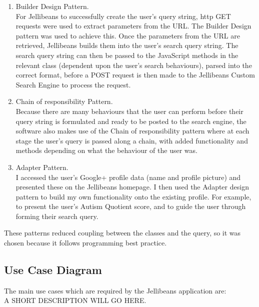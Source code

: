 \documentclass[a4paper, 11pt]{article}
\begin{document}
\begin{enumerate}
\item{Builder Design Pattern.}\\
For Jellibeans to successfully create the user's query string, http GET requests were used to extract parameters from the URL. The Builder Design pattern was used to achieve this. Once the parameters from the URL are retrieved, Jellibeans builds them into the user's search query string. The search query string can then be passed to the JavaScript methods in the relevant class (dependent upon the user's search behaviours), parsed into the correct format, before a POST request is then made to the Jellibeans Custom Search Engine to process the request.
\item{Chain of responsibility Pattern.}\\
Because there are many behaviours that the user can perform before their query string is formulated and ready to be posted to the search engine, the software also makes use of the Chain of responsibility pattern where at each stage the user's query is passed along a chain, with added functionality and methods depending on what the behaviour of the user was.
\item{Adapter Pattern.}\\
I accessed the user's Google+ profile data (name and profile picture) and presented these on the Jellibeans homepage. I then used the Adapter design pattern to build my own functionality onto the existing profile. For example, to present the user's Autism Quotient score, and to guide the user through forming their search query. 
\end{enumerate}


These patterns reduced coupling between the classes and the query, so it was chosen because it follows programming best practice.


\subsection{Use Case Diagram}
The main use cases which are required by the Jellibeans application are:\\
A SHORT DESCRIPTION WILL GO HERE.
\end{document}
